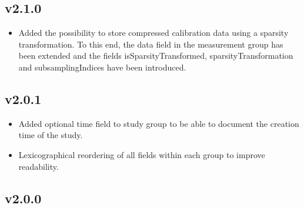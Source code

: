 \documentclass[landscape,a4paper]{article} %
\newcommand{\inlvar}[1]{{\ttfamily#1}}
\begin{document}
\begin{multicols}{2}
\subsection{v2.1.0}

\begin{itemize}
	\item Added the possibility to store compressed calibration data using a sparsity transformation. To this end, the \inlvar{data} field in the  \inlvar{measurement} group has been extended and the fields \inlvar{isSparsityTransformed}, \inlvar{sparsityTransformation} and \inlvar{subsamplingIndices} have been introduced.
\end{itemize}

\subsection{v2.0.1}

\begin{itemize}
	\item Added optional \inlvar{time} field to \inlvar{study} group to be able to document the creation time of the study.
	\item Lexicographical reordering of all fields within each group to improve readability.
\end{itemize}


\subsection{v2.0.0}


\end{multicols}
\end{document}
